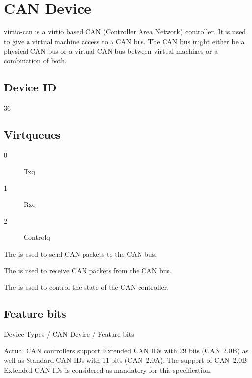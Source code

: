 \section{CAN Device}\label{sec:Device Types / CAN Device}

virtio-can is a virtio based CAN (Controller Area Network) controller.
It is used to give a virtual machine access to a CAN bus. The CAN bus
might either be a physical CAN bus or a virtual CAN bus between virtual
machines or a combination of both.

\subsection{Device ID}\label{sec:Device Types / CAN Device / Device ID}

36

\subsection{Virtqueues}\label{sec:Device Types / CAN Device / Virtqueues}

\begin{description}
\item[0] Txq
\item[1] Rxq
\item[2] Controlq
\end{description}

The  is used to send CAN packets to the CAN bus.

The  is used to receive CAN packets from the CAN bus.

The  is used to control the state of the CAN controller.

\subsection{Feature bits}{Device Types / CAN Device / Feature bits}

Actual CAN controllers support Extended CAN IDs with 29 bits (CAN~2.0B)
as well as Standard CAN IDs with 11 bits (CAN~2.0A). The support of
CAN~2.0B Extended CAN IDs is considered as mandatory for this
specification.

